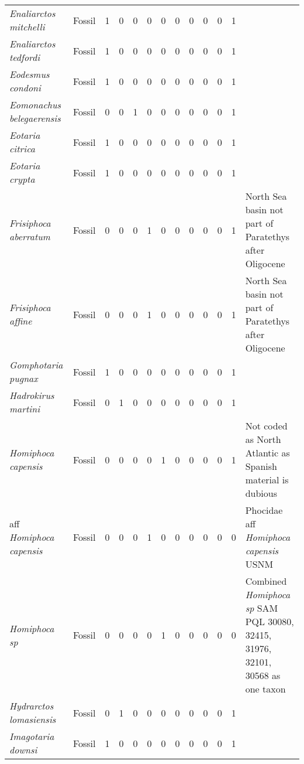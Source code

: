 \begin{longtable}{llccccccccccp{}}
\textit{Enaliarctos mitchelli} &
Fossil &
1 &
0 &
0 &
0 &
0 &
0 &
0 &
0 &
0 &
1 &
\\

\textit{Enaliarctos tedfordi} &
Fossil &
1 &
0 &
0 &
0 &
0 &
0 &
0 &
0 &
0 &
1 &
\\

\textit{Eodesmus condoni} &
Fossil &
1 &
0 &
0 &
0 &
0 &
0 &
0 &
0 &
0 &
1 &
\\

\textit{Eomonachus belegaerensis} &
Fossil &
0 &
0 &
1 &
0 &
0 &
0 &
0 &
0 &
0 &
1 &
\\

\textit{Eotaria citrica} &
Fossil &
1 &
0 &
0 &
0 &
0 &
0 &
0 &
0 &
0 &
1 &
\\

\textit{Eotaria crypta} &
Fossil &
1 &
0 &
0 &
0 &
0 &
0 &
0 &
0 &
0 &
1 &
\\

\textit{Frisiphoca aberratum} &
Fossil &
0 &
0 &
0 &
1 &
0 &
0 &
0 &
0 &
0 &
1 &
North Sea basin not part of Paratethys after Oligocene\\

\textit{Frisiphoca affine} &
Fossil &
0 &
0 &
0 &
1 &
0 &
0 &
0 &
0 &
0 &
1 &
North Sea basin not part of Paratethys after Oligocene\\

\textit{Gomphotaria pugnax} &
Fossil &
1 &
0 &
0 &
0 &
0 &
0 &
0 &
0 &
0 &
1 &
\\

\textit{Hadrokirus martini} &
Fossil &
0 &
1 &
0 &
0 &
0 &
0 &
0 &
0 &
0 &
1 &
\\

\textit{Homiphoca capensis} &
Fossil &
0 &
0 &
0 &
0 &
1 &
0 &
0 &
0 &
0 &
1 &
Not coded as North Atlantic as Spanish material is dubious\\

aff \textit{Homiphoca capensis} &
Fossil &
0 &
0 &
0 &
1 &
0 &
0 &
0 &
0 &
0 &
0 &
Phocidae aff \textit{Homiphoca capensis} USNM\\

\textit{Homiphoca sp} &
Fossil &
0 &
0 &
0 &
0 &
1 &
0 &
0 &
0 &
0 &
0 &
Combined \textit{Homiphoca sp} SAM PQL 30080, 32415, 31976, 32101, 30568 as one taxon\\

\textit{Hydrarctos lomasiensis} &
Fossil &
0 &
1 &
0 &
0 &
0 &
0 &
0 &
0 &
0 &
1 &
\\

\textit{Imagotaria downsi} &
Fossil &
1 &
0 &
0 &
0 &
0 &
0 &
0 &
0 &
0 &
1 &
\\


\end{longtable}

